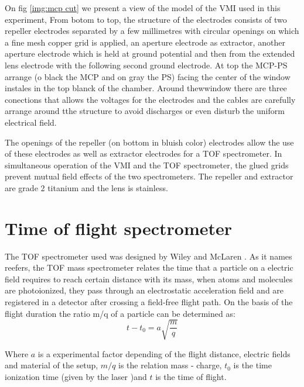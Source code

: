On fig \ref{img:mcp cut} we present a view of the model of the VMI used in this experiment, From botom to top, the structure of the electrodes consists of two repeller electrodes separated by a few millimetres with circular openings on which a fine mesh copper grid is applied, an aperture electrode as extractor, another aperture electrode which is held at ground potential and then from the extended lens electrode with the following second ground electrode. At top  the MCP-PS arrange (o black the MCP and on gray the PS) facing the center of the window instales in the top blanck of the chamber. Around thewwindow there are three conections that allows the voltages for the electrodes and the cables are carefully arrange around tthe structure to avoid discharges or even disturb the uniform electrical field.

The openings of the repeller (on bottom in bluish color) electrodes allow the use of these electrodes as well as extractor electrodes for a TOF spectrometer. In simultaneous operation of the VMI and the TOF spectrometer, the glued grids prevent mutual field effects of the two spectrometers.  The repeller and extractor are grade 2 titanium and the lens is stainless.

\section{Time of flight spectrometer}

The TOF spectrometer used was designed by Wiley and McLaren \cite{wiley_timeflight_1955}. As it names reefers, the TOF mass spectrometer relates the time that a particle on a electric field requires to reach certain distance with its mass,  when atoms and molecules are photoionized,  they pass through an electrostatic acceleration field and are registered in a detector after crossing a field-free flight path. On the basis of the flight duration the ratio m/q of a particle can be determined as:
\begin{equation}
t-t_{0}=a\sqrt{\frac{m}{q}}
\end{equation}

Where $a$ is a experimental factor depending of the flight distance, electric fields and material of the setup,  $m/q$ is the relation mass - charge, $t_{0}$ is the time ionization time (given by the laser )and $t$ is the time of flight.

